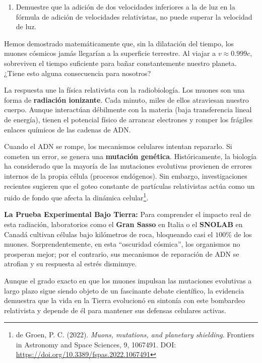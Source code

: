 \documentclass[11pt,a4paper]{book}
\begin{document}
\begin{enumerate}
\item Demuestre que la adición de dos velocidades inferiores a la de luz en la fórmula de adición de velocidades relativistas, no puede superar la velocidad de luz.
\end{enumerate}

\begin{tcolorbox}[colback=green!5!white,colframe=green!60!black,title=\textbf{Conexión Interdisciplinaria: Relatividad, Muones y ADN}]

Hemos demostrado matemáticamente que, sin la dilatación del tiempo, los muones cósmicos jamás llegarían a la superficie terrestre. Al viajar a $v \approx 0.999c$, sobreviven el tiempo suficiente para bañar constantemente nuestro planeta. ¿Tiene esto alguna consecuencia para nosotros?

La respuesta une la física relativista con la radiobiología. Los muones son una forma de \textbf{radiación ionizante}. Cada minuto, miles de ellos atraviesan nuestro cuerpo. Aunque interactúan débilmente con la materia (baja transferencia lineal de energía), tienen el potencial físico de arrancar electrones y romper los frágiles enlaces químicos de las cadenas de ADN.

Cuando el ADN se rompe, los mecanismos celulares intentan repararlo. Si cometen un error, se genera una \textbf{mutación genética}. Históricamente, la biología ha considerado que la mayoría de las mutaciones evolutivas provienen de errores internos de la propia célula (procesos endógenos). Sin embargo, investigaciones recientes sugieren que el goteo constante de partículas relativistas actúa como un ruido de fondo que afecta la dinámica celular\footnote{de Groen, P. C. (2022). \textit{Muons, mutations, and planetary shielding}. Frontiers in Astronomy and Space Sciences, 9, 1067491. DOI: \url{https://doi.org/10.3389/fspas.2022.1067491}}.

\textbf{La Prueba Experimental Bajo Tierra:}
Para comprender el impacto real de esta radiación, laboratorios como el \textbf{Gran Sasso} en Italia o el \textbf{SNOLAB} en Canadá cultivan células bajo kilómetros de roca, bloqueando casi el $100\%$ de los muones. Sorprendentemente, en esta ``oscuridad cósmica'', los organismos no prosperan mejor; por el contrario, sus mecanismos de reparación de ADN se atrofian y su respuesta al estrés disminuye. 

Aunque el grado exacto en que los muones impulsan las mutaciones evolutivas a largo plazo sigue siendo objeto de un fascinante debate científico, la evidencia demuestra que la vida en la Tierra evolucionó en sintonía con este bombardeo relativista y depende de él para mantener sus defensas celulares activas.
\end{tcolorbox}
\end{document}
